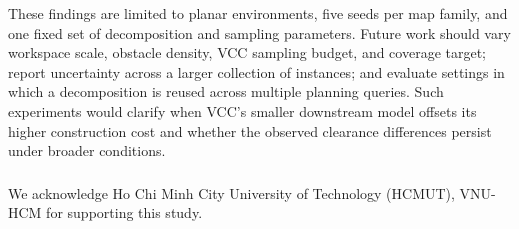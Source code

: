 ﻿\documentclass[runningheads]{llncs}
\begin{document}
These findings are limited to planar environments, five seeds per map family,
and one fixed set of decomposition and sampling parameters. Future work should
vary workspace scale, obstacle density, VCC sampling budget, and coverage target;
report uncertainty across a larger collection of instances; and evaluate
settings in which a decomposition is reused across multiple planning queries.
Such experiments would clarify when VCC's smaller downstream model offsets its
higher construction cost and whether the observed clearance differences persist
under broader conditions.

\begin{credits}
\subsubsection{\ackname} We acknowledge Ho Chi Minh City University of Technology (HCMUT), VNU-HCM for supporting this study.
\end{credits}


\end{document}
